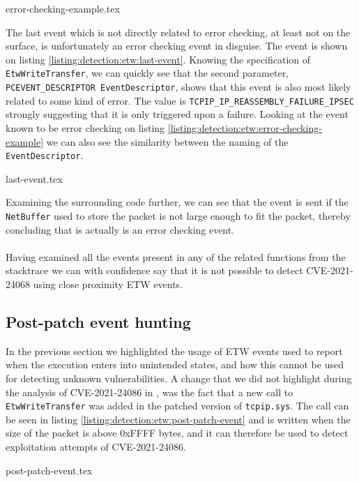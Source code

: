 \documentclass{report}
\begin{document}
{error-checking-example.tex}

The last event which is not directly related to error checking, at least not on the surface, is unfortunately an error checking event in disguise. The event is shown on listing \ref{listing:detection:etw:last-event}. Knowing the specification of \texttt{EtwWriteTransfer}\cite{url:etw:etwwritetransfer-api}, we can quickly see that the second parameter, \texttt{PCEVENT_DESCRIPTOR EventDescriptor}, shows that this event is also most likely related to some kind of error\cite{url:etw:etwwritetransfer-api}. The value is \texttt{TCPIP_IP_REASSEMBLY_FAILURE_IPSEC}\cite{url:etw:etw-event-descriptor} strongly suggesting that it is only triggered upon a failure. Looking at the event known to be error checking on listing \ref{listing:detection:etw:error-checking-example} we can also see the similarity between the naming of the \texttt{EventDescriptor}.

{last-event.tex}

Examining the surrounding code further, we can see that the event is sent if the \texttt{NetBuffer} used to store the packet is not large enough to fit the packet, thereby concluding that is actually is an error checking event.
\\
\\
Having examined all the events present in any of the related functions from the stacktrace we can with confidence say that it is not possible to detect CVE-2021-24068 using close proximity \gls{ETW} events.

\subsection{Post-patch  event hunting}
In the previous section we highlighted the usage of \gls{ETW} events used to report when the execution enters into unintended states, and how this cannot be used for detecting unknown vulnerabilities. A change that we did not highlight during the analysis of CVE-2021-24086 in , was the fact that a new call to \texttt{EtwWriteTransfer} was added in the patched version of \texttt{tcpip.sys}. The call can be seen in listing \ref{listing:detection:etw:post-patch-event} and is written when the size of the packet is above 0xFFFF bytes, and it can therefore be used to detect exploitation attempts of CVE-2021-24086.

{post-patch-event.tex}
\end{document}
